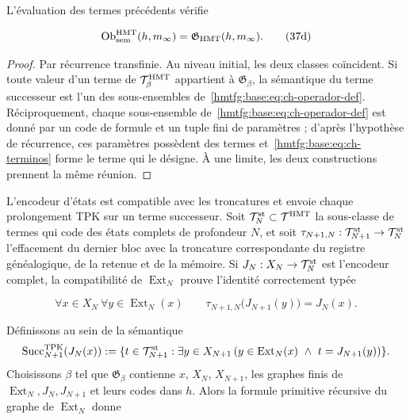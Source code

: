 \begin{theorem}
\label{hmtfg:base:thm:ch-6a}
L’évaluation des
termes précédents vérifie

\[
 \operatorname{Ob}_{\rm sem}^{\rm HMT}(h,m_\infty)
 =\mathfrak G_{\rm HMT}(h,m_\infty).
\tag{37d}\label{hmtfg:base:eq:ch-equivalencia-semantica}
\]

\end{theorem}
\begin{proof}
Par récurrence transfinie. Au niveau initial, les deux classes coïncident. Si toute valeur d'un terme de \(\mathcal T^{\rm HMT}_\beta\) appartient à \(\mathfrak G_\beta\), la sémantique du terme successeur est l'un des sous-ensembles de~\eqref{hmtfg:base:eq:ch-operador-def}. Réciproquement, chaque sous-ensemble de~\eqref{hmtfg:base:eq:ch-operador-def} est donné par un code de formule et un tuple fini de paramètres ; d'après l'hypothèse de récurrence, ces paramètres possèdent des termes et~\eqref{hmtfg:base:eq:ch-terminos} forme le terme qui le désigne. À une limite, les deux constructions prennent la même réunion.
\end{proof}

L’encodeur d’états est compatible avec les troncatures et envoie chaque
prolongement TPK sur un terme successeur. Soit
\(\mathcal T_N^{\rm st}\subset\mathcal T^{\rm HMT}\) la sous-classe de termes
qui code des états complets de profondeur \(N\), et soit
\(\tau_{N+1,N}:\mathcal T_{N+1}^{\rm st}\to\mathcal T_N^{\rm st}\) l’effacement
du dernier bloc avec la troncature correspondante du registre généalogique,
de la retenue et de la mémoire. Si \(J_N:X_N\to\mathcal T_N^{\rm st}\) est l’encodeur
complet, la compatibilité de \(\operatorname{Ext}_N\) prouve l’identité
correctement typée

\[
 \forall x\in X_N\ \forall y\in\operatorname{Ext}_N(x)\qquad
 \tau_{N+1,N}\bigl(J_{N+1}(y)\bigr)=J_N(x).
\tag{37e$_0$}\label{hmtfg:base:eq:ch-naturalidad-codificador}
\]

Définissons au sein de la sémantique
\[
 \operatorname{Succ}^{\rm TPK}_{N+1}(J_N(x)):=
 \{t\in\mathcal T_{N+1}^{\rm st}:\exists y\in X_{N+1}\,
   (y\in\operatorname{Ext}_N(x)\ \wedge\ t=J_{N+1}(y))\}.
\]
Choisissons \(\beta\) tel que \(\mathfrak G_\beta\) contienne \(x\), \(X_N\),
\(X_{N+1}\), les graphes finis de
\(\operatorname{Ext}_N,J_N,J_{N+1}\) et leurs codes dans \(h\). Alors la
formule primitive récursive du graphe de \(\operatorname{Ext}_N\) donne

